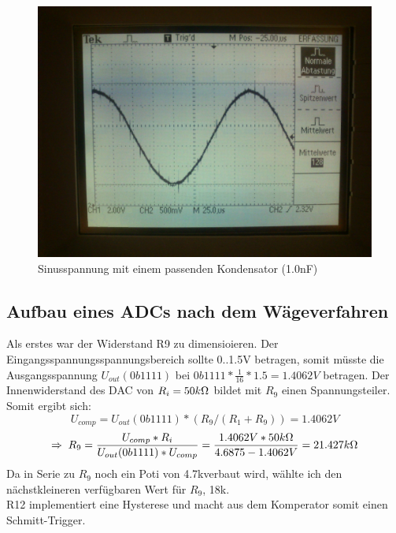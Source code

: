\begin{figure}[H]
	\centering
	\includegraphics[width=\linewidth]{versuch9/oszi/DSC_0631.JPG}
	\caption{Sinusspannung mit einem passenden Kondensator (1.0nF)}
\end{figure}

\subsection{Aufbau eines ADCs nach dem Wägeverfahren}
Als erstes war der Widerstand R9 zu dimensioieren. Der Eingangsspannungsspannungsbereich sollte 0..1.5V betragen, somit müsste die Ausgangsspannung $U_{out}(0b1111)$ bei $0b1111 * \frac{1}{16} * 1.5 = 1.4062V$ betragen. Der Innenwiderstand des DAC von $R_i=50k\Omega$ bildet mit $R_9$ einen Spannungsteiler. Somit ergibt sich:
\[U_{comp}=U_{out}(0b1111)*(R_9/(R_1+R_9))=1.4062V\]
\[\Rightarrow\; R_9=\frac{U_{comp}*R_i}{U_{out}(0b1111)*U_{comp}}=\frac{1.4062V*50k\Omega}{4.6875-1.4062V}=21.427k\Omega \]
Da in Serie zu $R_9$ noch ein Poti von 4.7k\Ohm verbaut wird, wählte ich den nächstkleineren verfügbaren Wert für $R_9$, 18k\Ohm.\\
R12 implementiert eine Hysterese und macht aus dem Komperator somit einen Schmitt-Trigger.

